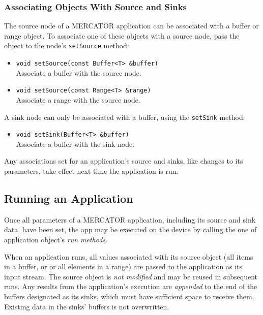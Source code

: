 \documentclass[11pt]{article}
\begin{document}
\subsubsection{Associating Objects With Source and Sinks}

The source node of a MERCATOR application can be associated with a
buffer or range object.  To associate one of these objects with a
source node, pass the object to the node's \texttt{setSource} method:
\begin{itemize}

\item \texttt{void setSource(const Buffer<T> \&buffer)} \\
  Associate a buffer with the source node.

\item \texttt{void setSource(const Range<T> \&range)} \\
  Associate a range with the source node.

\end{itemize}

A sink node can only be associated with a buffer, using the 
\texttt{setSink} method:
\begin{itemize}

\item \texttt{void setSink(Buffer<T> \&buffer)} \\
  Associate a buffer with the sink node.

\end{itemize}
Any associations set for an application's source and sinks, like
changes to its parameters, take effect next time the application is
run.

\subsection{Running an Application}

Once all parameters of a MERCATOR application, including its source
and sink data, have been set, the app may be executed on the device by
calling the one of application object's \textit{run methods}.

When an application runs, all values associated with its source object
(all items in a buffer, or or all elements in a range) are passed to
the application as its input stream. The source object is \emph{not
  modified} and may be reused in subsequent runs.  Any results from
the application's execution are \emph{appended} to the end of the
buffers designated as its sinks, which must have sufficient space to
receive them.  Existing data in the sinks' buffers is not overwritten.
\end{document}
